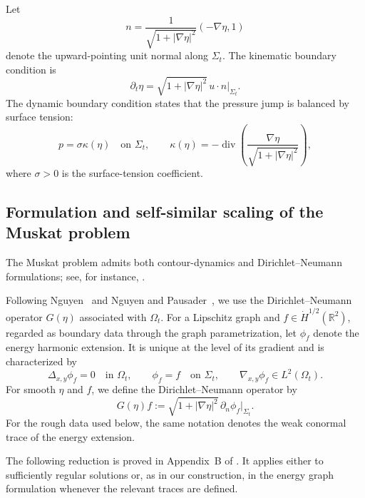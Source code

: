 \documentclass[12pt]{amsart}
\theoremstyle{remark}
\theoremstyle{definition}
\numberwithin{equation}{section}
\newcommand{\R}{\mathbb{R}}
\begin{document}
Let
\begin{equation*}
 n=\frac{1}{\sqrt{1+|\nabla\eta|^2}}(-\nabla\eta,1)
\end{equation*}
denote the upward-pointing unit normal along \(\Sigma_t\).
The kinematic boundary condition is
\begin{equation*}
 \partial_t\eta=\sqrt{1+|\nabla\eta|^2}\,u\cdot n\big|_{\Sigma_t}.
\end{equation*}
The dynamic boundary condition states that the pressure jump is balanced by surface tension:
\begin{equation*}
 p=\sigma\kappa(\eta) \quad\text{on }\Sigma_t, \qquad \kappa(\eta)=-\operatorname{div}\left(\frac{\nabla\eta}{\sqrt{1+|\nabla\eta|^2}}\right),
\end{equation*}
where \(\sigma>0\) is the surface-tension coefficient.

\subsection{Formulation and self-similar scaling of the Muskat problem}
The Muskat problem admits both contour-dynamics and
Dirichlet--Neumann formulations; see, for instance,
\cite{MR4520423,MR3415681,MR3171344,MR2313156,MR2993754,
MR3608884,MR3071395}.

Following Nguyen~\cite{MR4131404} and Nguyen and Pausader~\cite{MR4090462},
we use the Dirichlet--Neumann operator \(G(\eta)\) associated with
\(\Omega_t\). For a Lipschitz graph and
\(f\in\dot H^{1/2}(\R^2)\), regarded as boundary data through the graph
parametrization, let \(\phi_f\) denote the energy harmonic extension. It is
unique at the level of its gradient and is characterized by
\begin{equation*}
 \Delta_{x,y}\phi_f=0 \quad\text{in }\Omega_t, \qquad
 \phi_f=f \quad\text{on }\Sigma_t, \qquad
 \nabla_{x,y}\phi_f\in L^2(\Omega_t).
\end{equation*}
For smooth \(\eta\) and \(f\), we define the Dirichlet--Neumann operator by
\begin{equation*}
 G(\eta)f:=\sqrt{1+|\nabla\eta|^2}\,\partial_n\phi_f\big|_{\Sigma_t}.
\end{equation*}
For the rough data used below, the same notation denotes the weak conormal trace of the energy extension.

The following reduction is proved in Appendix~B of
\cite{MR4131404}. It applies either to sufficiently regular solutions or,
as in our construction, in the energy graph formulation whenever the
relevant traces are defined.
\end{document}
